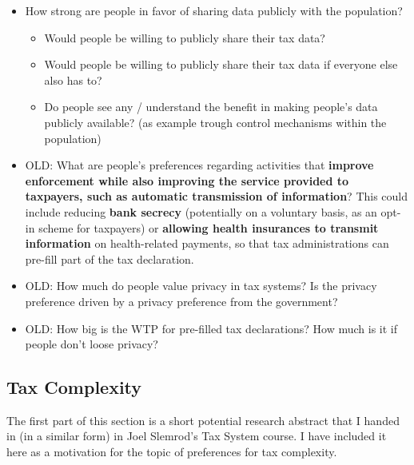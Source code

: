 \documentclass[a4paper, 12pt]{article}
\begin{document}
\begin{itemize}
    \begin{itemize}
        \item How do all these views about sharing information change if we think about someone non-governmental holding the data. And important is, that this institution keeps the data very private. Basically this institution would collect the data as a service for the tax payer, however, it would not send it to the tax authorities directly. Therefore people CAN use its services when handing in tax declarations. It would bring the personal benefits of harmonizing data. 
    \end{itemize}
    \item How strong are people in favor of sharing data publicly with the population?
    \begin{itemize}
        \item Would people be willing to publicly share their tax data? 
        \item Would people be willing to publicly share their tax data if everyone else also has to?
        \item Do people see any / understand the benefit in making people's data publicly available? (as example trough control mechanisms within the population)
    \end{itemize}
\end{itemize}

\begin{itemize}
    \item OLD: What are people’s preferences regarding activities that \textbf{improve enforcement while also improving the service  provided to taxpayers, such as automatic transmission of information}? This could include reducing\textbf{ bank secrecy}  (potentially on a voluntary basis, as an opt-in scheme for taxpayers) or \textbf{allowing health insurances to transmit  information} on health-related payments, so that tax administrations can pre-fill part of the tax declaration.
    \item OLD: How much do people value privacy in tax systems? Is the privacy preference driven by a privacy preference from the government?
    \item OLD: How big is the WTP for pre-filled tax declarations? How much is it if people don't loose privacy?
\end{itemize}

\subsection{Tax Complexity}
The first part of this section is a short potential research abstract that I handed in (in a similar form) in Joel Slemrod's Tax System course. I have included it here as a motivation for the topic of preferences for tax complexity.    
\end{document}
